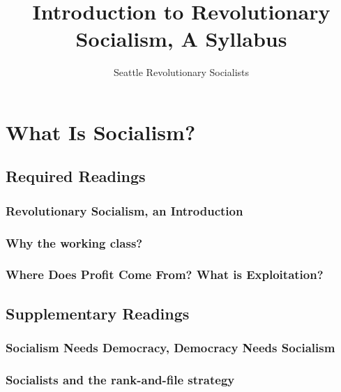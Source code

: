 \documentclass[12pt,a4paper]{report}
\title{Introduction to Revolutionary Socialism, A Syllabus}
\author{Seattle Revolutionary Socialists}
\begin{document}
\maketitle

\tableofcontents

\chapter{What Is Socialism?}
\section{Required Readings}

\subsection{Revolutionary Socialism, an Introduction}

\clearpage

\subsection{Why the working class?}

\clearpage

\subsection{Where Does Profit Come From? What is Exploitation?}

\clearpage

\section{Supplementary Readings}
\subsection{Socialism Needs Democracy, Democracy Needs Socialism}

\clearpage

\subsection{Socialists and the rank-and-file strategy}

\clearpage
\end{document}
